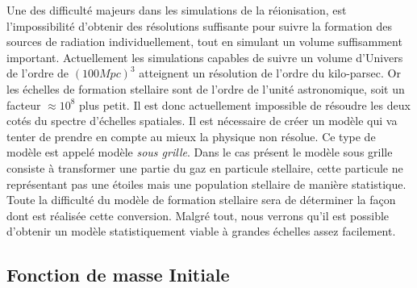Une des difficulté majeurs dans les simulations de la réionisation, est l'impossibilité d'obtenir des résolutions suffisante pour suivre la formation des sources de radiation individuellement, tout en simulant un volume suffisamment important.
Actuellement les simulations capables de suivre un volume d'Univers de l'ordre de $(100Mpc)^3$ atteignent un résolution de l'ordre du kilo-parsec.
Or les échelles de formation stellaire sont de l'ordre de l'unité astronomique, soit un facteur $\approx 10^8$ plus petit.
Il est donc actuellement impossible de résoudre les deux cotés du spectre d'échelles spatiales.
Il est nécessaire de créer un modèle qui va tenter de prendre en compte au mieux la physique non résolue.
Ce type de modèle est appelé modèle \textit{sous grille}.
Dans le cas présent le modèle sous grille consiste à transformer une partie du gaz en particule stellaire, cette particule ne représentant pas une étoiles mais une population stellaire de manière statistique.
Toute la difficulté du modèle de formation stellaire sera de déterminer la façon dont est réalisée cette conversion.
Malgré tout, nous verrons qu'il est possible d'obtenir un modèle statistiquement viable à grandes échelles assez facilement.




\subsection{Fonction de masse Initiale}

